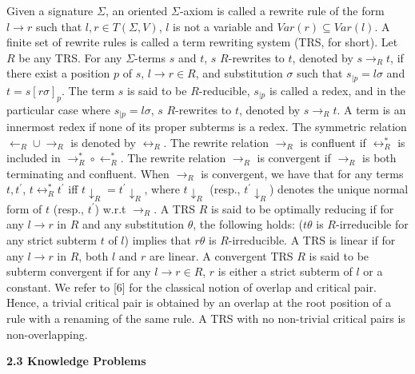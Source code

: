 \documentclass[10pt,a4paper]{amsart}
\begin{document}
 
Given a signature $\Sigma$, an oriented $\Sigma$-axiom is called a rewrite rule of the form $l\rightarrow r$ such that $l,r\in T(\Sigma,V)$, $l$ is not a variable and $\mathit{Var}(r)\subseteq\mathit{Var}(l)$. A finite set of rewrite rules is called a term rewriting system (TRS, for short). Let $R$ be any TRS. For any $\Sigma$-terms $s$ and $t$, $s$ $R$-rewrites to $t$, denoted by $s\rightarrow_{R}t$, if there exist a position $p$ of $s$, $l\rightarrow r\in R$, and substitution $\sigma$ such that $s_{|p}=l\sigma$ and $t=s[r\sigma]_{p}$. The term $s$ is said to be $R$-reducible, $s_{|p}$ is called a redex, and in the particular case where $s_{|p}=l\sigma$, $s$ $R$-rewrites to $t$, denoted by $s\rightarrow_{R}t$. A term is an innermost redex if none of its proper subterms is a redex. The symmetric relation $\leftarrow_{R}\cup\rightarrow_{R}$ is denoted by $\longleftrightarrow_{R}$. The rewrite relation $\rightarrow_{R}$ is confluent if $\longleftrightarrow_{R}^{*}$ is included in $\rightarrow_{R}^{*}\circ\leftarrow_{R}^{*}$. The rewrite relation $\rightarrow_{R}$ is convergent if $\rightarrow_{R}$ is both terminating and confluent. When $\rightarrow_{R}$ is convergent, we have that for any terms $t,t^{\prime}$, $t\longleftrightarrow_{R}^{*}t^{\prime}$ iff $t{\downarrow}_{R}=t^{\prime}{\downarrow}_{R}$, where $t{\downarrow}_{R}$ (resp., $t^{\prime}{\downarrow}_{R}$) denotes the unique normal form of $t$ (resp., $t^{\prime}$) w.r.t $\rightarrow_{R}$. A TRS $R$ is said to be optimally reducing if for any $l\rightarrow r$ in $R$ and any substitution $\theta$, the following holds: ($t\theta$ is $R$-irreducible for any strict subterm $t$ of $l$) implies that $r\theta$ is $R$-irreducible. A TRS is linear if for any $l\rightarrow r$ in $R$, both $l$ and $r$ are linear. A convergent TRS $R$ is said to be subterm convergent if for any $l\rightarrow r\in R$, $r$ is either a strict subterm of $l$ or a constant. We refer to [6] for the classical notion of overlap and critical pair. Hence, a trivial critical pair is obtained by an overlap at the root position of a rule with a renaming of the same rule. A TRS with no non-trivial critical pairs is non-overlapping.\par
 
 
 
 
\par\medskip\noindent\textbf{2.3 Knowledge Problems}\par
 
\end{document}
